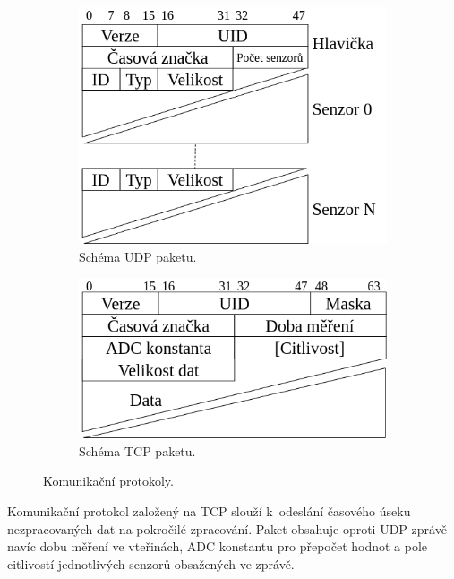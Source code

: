 \begin{figure}[h]
\centering
\begin{subfigure}{.5\textwidth}
  \centering
    \includegraphics[width=.9\linewidth]{obrazky-figures/udp_paket.png}
    \caption{Schéma UDP paketu.}
  \label{pic:udp_protocol}
\end{subfigure}
\begin{subfigure}{.5\textwidth}
  \centering
    \includegraphics[width=.9\linewidth]{obrazky-figures/tcp_paket.png}
    \caption{Schéma TCP paketu.}
  \label{pic:tcp_protocol}
\end{subfigure}
\caption{Komunikační protokoly.}
\label{fig:test}
\end{figure}

Komunikační protokol založený na TCP slouží k~odeslání časového úseku nezpracovaných dat na pokročilé zpracování. Paket obsahuje oproti UDP zprávě navíc dobu měření ve vteřinách, ADC konstantu pro přepočet hodnot a pole citlivostí jednotlivých senzorů obsažených ve zprávě.



